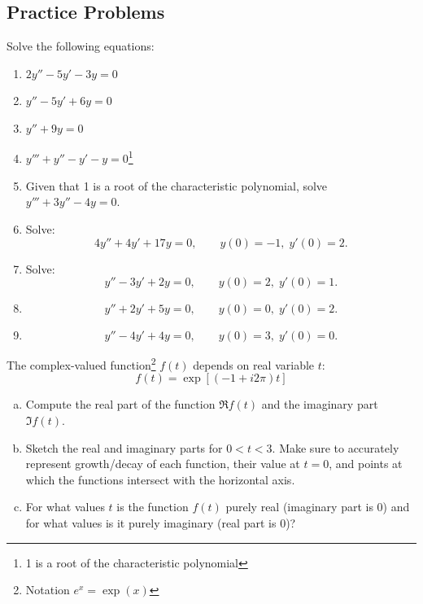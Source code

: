 

  

  \subsection*{Practice Problems}
  \begin{question}
  Solve the following equations:
  \begin{enumerate}
      \item \(2y'' - 5y' - 3y = 0\)
      \item $y''-5y'+6y=0$
      \item $y''+9y=0$
      \item $y''' + y'' - y' - y = 0$\footnote{1 is a root of the characteristic polynomial}
      \item Given that 1 is a root of the characteristic polynomial, solve \(y''' + 3y'' - 4y = 0\).
      \item Solve:
      \[
      4y'' + 4y' + 17y = 0, \qquad y(0)=-1, \; y'(0)=2.
      \]
      \item Solve: 
      \[
      y'' - 3y' + 2y = 0, \qquad y(0)=2,\; y'(0)=1.
      \]
      \item
      \[
      y'' + 2y' + 5y = 0, \qquad y(0)=0,\; y'(0)=2.
      \]
      \item
      \[
      y'' - 4y' + 4y = 0, \qquad y(0)=3,\; y'(0)=0.
      \]
  \end{enumerate}
  \end{question}


  \begin{question}
    The complex-valued function\footnote{Notation \(e^{x} = \exp(x)\)}  \(f(t)\) depends on real variable \(t\):
    \[
    f(t) =    \exp\left[(-1+i2\pi)t\right]
    \]
    \begin{enumerate}[(a)]
      \item Compute the real part of the function \(\Re f(t)\) and the imaginary part \(\Im f(t)\). \solspace{.25in}
      \item Sketch the real and imaginary parts for \(0 < t < 3\). Make sure to accurately represent growth/decay of each function, their value at \(t=0\), and points at which the functions intersect with the horizontal axis.

      \item For what values \(t\) is the function \(f(t)\) purely real (imaginary part is 0) and for what values is it purely imaginary (real part is \(0\))?

      \vspace{1em}

       \quad {}
    \end{enumerate}
  \end{question}


